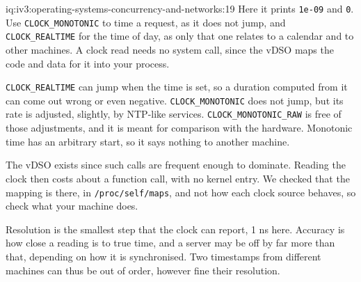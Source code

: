 \begin{solution}{iq:iv3:operating-systems-concurrency-and-networks:19}
Here it prints \texttt{1e-09} and \texttt{0}. Use \texttt{CLOCK\_MONOTONIC} to time a request, as it does not jump, and \texttt{CLOCK\_REALTIME} for the time of day, as only that one relates to a calendar and to other machines. A clock read needs no system call, since the vDSO maps the code and data for it into your process.

\texttt{CLOCK\_REALTIME} can jump when the time is set, so a duration computed from it can come out wrong or even negative. \texttt{CLOCK\_MONOTONIC} does not jump, but its rate is adjusted, slightly, by NTP-like services. \texttt{CLOCK\_MONOTONIC\_RAW} is free of those adjustments, and it is meant for comparison with the hardware. Monotonic time has an arbitrary start, so it says nothing to another machine.

The vDSO exists since such calls are frequent enough to dominate. Reading the clock then costs about a function call, with no kernel entry. We checked that the mapping is there, in \texttt{/proc/self/maps}, and not how each clock source behaves, so check what your machine does.

Resolution is the smallest step that the clock can report, 1 ns here. Accuracy is how close a reading is to true time, and a server may be off by far more than that, depending on how it is synchronised. Two timestamps from different machines can thus be out of order, however fine their resolution.

\end{solution}

